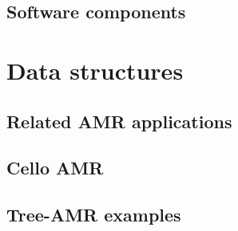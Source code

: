 \documentclass{beamer}
\begin{document}





\subsection{Software components}


% 
% 
% 
% 
% 

\section{Data structures}

\subsection{Related AMR applications}






\subsection{Cello AMR}





\subsection{Tree-AMR examples}




\end{document}
